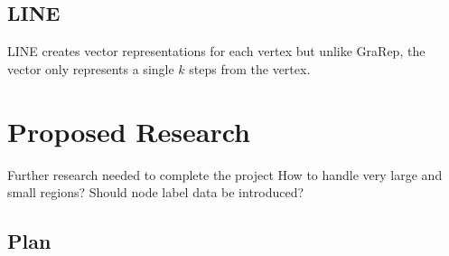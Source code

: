 \documentclass[journal,compsoc]{IEEEtran}
\begin{document}
\subsection{LINE \cite{Tang2015LINELI}}
LINE creates vector representations for each vertex but unlike GraRep, the vector only represents a single  ${k}$ steps from the vertex.

\section{Proposed Research}
Further research needed to complete the project
How to handle very large and small regions?
Should node label data be introduced?

\subsection{Plan}
\end{document}
